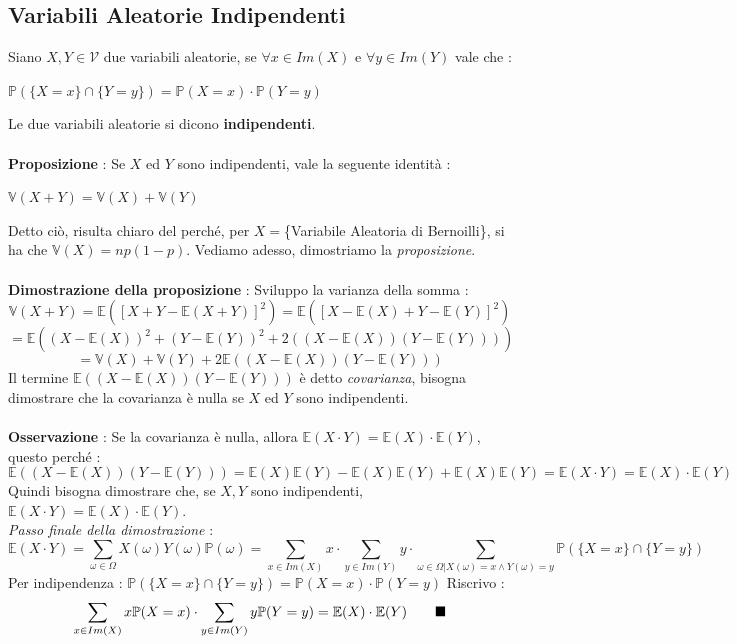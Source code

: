 \documentclass[12pt, letterpaper]{article}
\newcommand{\E}{{\mathbb E}}
\newcommand{\V}{{\mathbb V}}
\newcommand{\Prob}{{\mathbb P}}
\begin{document}
\subsection{Variabili Aleatorie Indipendenti}
Siano \(X,Y\in\mathcal{V}\) due variabili aleatorie, se \(\forall x\in Im(X)\) e \(\forall y\in Im(Y)\) vale che :
\begin{center}
    \(
      \Prob(\{X=x\}\cap\{Y=y\})=\Prob(X=x)\cdot\Prob(Y=y)  
    \)
\end{center}
Le due variabili aleatorie si dicono \textbf{indipendenti}.\\\hphantom{}\\
\textbf{Proposizione} : Se \(X\) ed \(Y\) sono indipendenti, vale la seguente identità :\begin{center}
    \(\V(X+Y)=\V(X)+\V(Y)\)
\end{center}
Detto ciò, risulta chiaro del perché, per \(X=\)\{Variabile Aleatoria di Bernoilli\}, si ha che \(\V(X)=np(1-p)\).
Vediamo adesso, dimostriamo la \textit{proposizione}.\\\hphantom{}\\
\textbf{Dimostrazione della proposizione} : Sviluppo la varianza della somma :
\begin{equation}
    \V(X+Y)=\E([X+Y-\E(X+Y)]^2)=\E([X-\E(X)+Y-\E(Y)]^2)
\end{equation}
\begin{equation}
    = \E((X-\E(X))^2+(Y-\E(Y))^2+2((X-\E(X))(Y-\E(Y))))
\end{equation}
\begin{equation}
    =\V(X)+\V(Y)+2\E((X-\E(X))(Y-\E(Y)))
\end{equation}
Il termine \(\E((X-\E(X))(Y-\E(Y)))\) è detto \textit{covarianza}, bisogna dimostrare che la covarianza è 
nulla se \(X\) ed \(Y\) sono indipendenti.\\\hphantom{}\\
\textbf{Osservazione} : Se la covarianza è nulla, allora \(\E(X\cdot Y)=\E(X)\cdot\E(Y)\), questo perché :\begin{equation}
    \E((X-\E(X))(Y-\E(Y)))=\E(X)\E(Y)-\E(X)\E(Y)+\E(X)\E(Y)=\E(X\cdot Y)=\E(X)\cdot\E(Y) 
\end{equation}
Quindi bisogna dimostrare che, se \(X,Y\) sono indipendenti, \(\E(X\cdot Y)=\E(X)\cdot\E(Y) \).
\\\textit{Passo finale della dimostrazione} : \begin{equation}
    \E(X\cdot Y)=\sum_{\omega\in \Omega}X(\omega)Y(\omega)\Prob({\omega})=
    \sum_{x\in Im(X)}x\cdot\sum_{y\in Im(Y)}y\cdot\sum_{
        \omega\in\Omega|X(\omega)=x\land Y(\omega)=y
    }\Prob(\{X=x\}\cap\{Y=y\})
\end{equation}
Per indipendenza :  \(
    \Prob(\{X=x\}\cap\{Y=y\})=\Prob(X=x)\cdot\Prob(Y=y)  
  \)
  Riscrivo :
  \begin{equation}
    \sum_{x\in Im(X)}x\Prob(X=x)\cdot\sum_{y\in Im(Y)}y\Prob(Y=y)=\E(X)\cdot\E(Y)\text{\hphantom{aaaa}}\blacksquare
  \end{equation}
\end{document}
